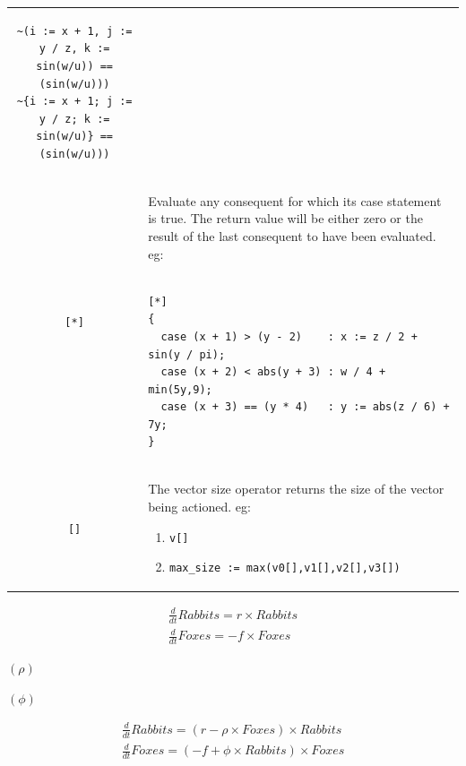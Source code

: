 \documentclass{book}
\def\lthtmlcheckvsize{\ifdim\ht\sizebox<\vsize 
  \ifdim\wd\sizebox<\hsize\expandafter\hfill\fi \expandafter\vfill
  \else\expandafter\vss\fi}%
\begin{document}
{\begin{tabular}{|c|p{}|}
\begin{verbatim}
~(i := x + 1, j := y / z, k := sin(w/u)) == (sin(w/u)))
~{i := x + 1; j := y / z; k := sin(w/u)} == (sin(w/u)))\end{verbatim}

\\
\verb'[*]'& Evaluate any consequent for which its case statement is 
true. The return value will be either zero or the result
of the last consequent to have been evaluated.          
eg:
\begin{verbatim}

[*]                                                     
{                                                       
  case (x + 1) > (y - 2)    : x := z / 2 + sin(y / pi); 
  case (x + 2) < abs(y + 3) : w / 4 + min(5y,9);        
  case (x + 3) == (y * 4)   : y := abs(z / 6) + 7y;     
}\end{verbatim}

\\
\verb'[]'& The vector size operator returns the size of the vector 
being actioned.                         
eg:
\begin{enumerate}
\item\verb"v[]"                                 
\item\verb"max_size := max(v0[],v1[],v2[],v3[])"
\end{enumerate}
\\
\hline
\end{tabular}%
\lthtmlfigureZ
\lthtmlcheckvsize\clearpage}

{\newpage\clearpage
{}%
\begin{displaymath}
\begin{array}{c}
\frac{d}{dt}Rabbits=r\times Rabbits\\
\frac{d}{dt}Foxes=-f\times Foxes
\end{array}
\end{displaymath}%
\lthtmldisplayZ
\lthtmlcheckvsize\clearpage}

{\newpage\clearpage
{}%
$\left(\rho\right)$%
\lthtmlindisplaymathZ
\lthtmlcheckvsize\clearpage}

{\newpage\clearpage
{}%
$\left(\phi\right)$%
\lthtmlindisplaymathZ
\lthtmlcheckvsize\clearpage}

{\newpage\clearpage
{}%
\begin{displaymath}
\begin{array}{c}
\frac{d}{dt}Rabbits=\left(r-\rho\times Foxes\right)\times Rabbits\\
\frac{d}{dt}Foxes=\left(-f+\phi\times Rabbits\right)\times Foxes
\end{array}
\end{displaymath}%
\lthtmldisplayZ
\lthtmlcheckvsize\clearpage}
\end{document}
